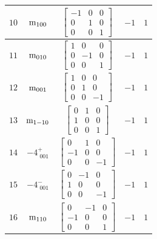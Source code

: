 \documentclass[fleqn,8pt]{jsarticle}
\begin{document}
\begin{longtable}{ccccc}
$ 10 $ & $ {\rm m}_{100} $ & $ \begin{bmatrix} -1 & 0 & 0 \\ 0 & 1 & 0 \\ 0 & 0 & 1 \end{bmatrix} $ & $ -1 $ & $ 1 $ \\ \hline
$ 11 $ & $ {\rm m}_{010} $ & $ \begin{bmatrix} 1 & 0 & 0 \\ 0 & -1 & 0 \\ 0 & 0 & 1 \end{bmatrix} $ & $ -1 $ & $ 1 $ \\ \hline
$ 12 $ & $ {\rm m}_{001} $ & $ \begin{bmatrix} 1 & 0 & 0 \\ 0 & 1 & 0 \\ 0 & 0 & -1 \end{bmatrix} $ & $ -1 $ & $ 1 $ \\ \hline
$ 13 $ & $ {\rm m}_{1-10} $ & $ \begin{bmatrix} 0 & 1 & 0 \\ 1 & 0 & 0 \\ 0 & 0 & 1 \end{bmatrix} $ & $ -1 $ & $ 1 $ \\ \hline
$ 14 $ & $ -4^{+}_{\,\,001} $ & $ \begin{bmatrix} 0 & 1 & 0 \\ -1 & 0 & 0 \\ 0 & 0 & -1 \end{bmatrix} $ & $ -1 $ & $ 1 $ \\ \hline
$ 15 $ & $ -4^{-}_{\,\,001} $ & $ \begin{bmatrix} 0 & -1 & 0 \\ 1 & 0 & 0 \\ 0 & 0 & -1 \end{bmatrix} $ & $ -1 $ & $ 1 $ \\ \hline
$ 16 $ & $ {\rm m}_{110} $ & $ \begin{bmatrix} 0 & -1 & 0 \\ -1 & 0 & 0 \\ 0 & 0 & 1 \end{bmatrix} $ & $ -1 $ & $ 1 $ \\
\end{longtable}
\end{document}
